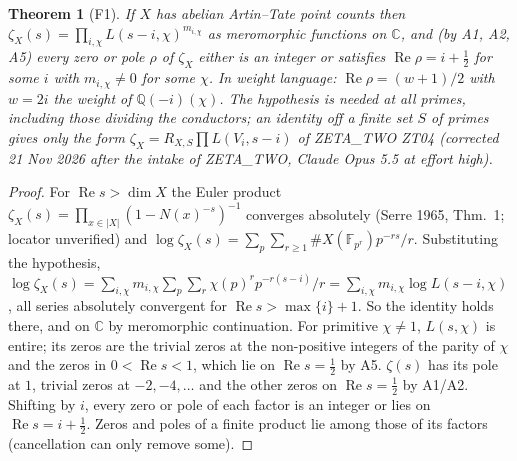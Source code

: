 \documentclass[11pt]{article}
\newtheorem{theorem}{Theorem}\newtheorem{lemma}[theorem]{Lemma}\newtheorem{corollary}[theorem]{Corollary}
\theoremstyle{definition}\newtheorem{definition}[theorem]{Definition}\newtheorem{remark}[theorem]{Remark}
\begin{document}
\begin{theorem}[F1]\label{F1} If $X$ has abelian Artin--Tate point counts then
$\zeta_X(s)=\prod_{i,\chi}L(s-i,\chi)^{m_{i,\chi}}$ as meromorphic functions on $\mathbb C$, and (by A1, A2, A5) every zero or
pole $\rho$ of $\zeta_X$ either is an integer or satisfies $\operatorname{Re}\rho=i+\tfrac12$ for some $i$ with
$m_{i,\chi}\neq0$ for some $\chi$. In weight language: $\operatorname{Re}\rho=(w+1)/2$ with $w=2i$ the weight of $\mathbb Q(-i)(\chi)$.
The hypothesis is needed at all primes, including those dividing the conductors; an identity off a finite set $S$ of
primes gives only the form $\zeta_X=R_{X,S}\prod L(V_i,s-i)$ of ZETA\_TWO ZT04 (corrected 21 Nov 2026 after the intake of
ZETA\_TWO, Claude Opus 5.5 at effort high).\end{theorem}
\begin{proof} For $\operatorname{Re}s>\dim X$ the Euler product $\zeta_X(s)=\prod_{x\in|X|}(1-N(x)^{-s})^{-1}$ converges
absolutely (Serre 1965, Thm.~1; locator unverified) and $\log\zeta_X(s)=\sum_p\sum_{r\ge1}\#X(\mathbb F_{p^r})p^{-rs}/r$.
Substituting the hypothesis, $\log\zeta_X(s)=\sum_{i,\chi}m_{i,\chi}\sum_p\sum_r\chi(p)^rp^{-r(s-i)}/r
=\sum_{i,\chi}m_{i,\chi}\log L(s-i,\chi)$, all series absolutely convergent for $\operatorname{Re}s>\max\{i\}+1$. So the
identity holds there, and on $\mathbb C$ by meromorphic continuation. For primitive $\chi\neq1$, $L(s,\chi)$ is entire;
its zeros are the trivial zeros at the non-positive integers of the parity of $\chi$ and the zeros in $0<\operatorname{Re}s<1$,
which lie on $\operatorname{Re}s=\tfrac12$ by A5. $\zeta(s)$ has its pole at $1$, trivial zeros at $-2,-4,\dots$ and the
other zeros on $\operatorname{Re}s=\tfrac12$ by A1/A2. Shifting by $i$, every zero or pole of each factor is an integer or
lies on $\operatorname{Re}s=i+\tfrac12$. Zeros and poles of a finite product lie among those of its factors (cancellation can
only remove some).\end{proof}
\end{document}
